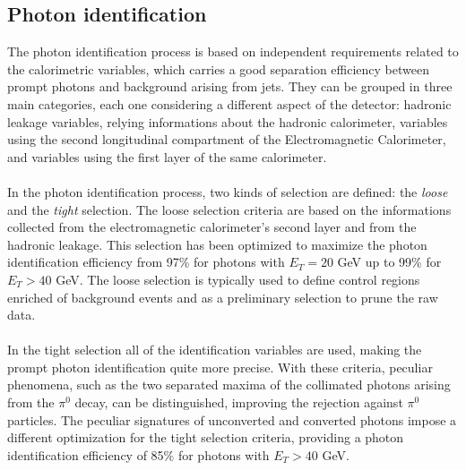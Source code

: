 \subsection{Photon identification}
The photon identification process is based on independent requirements related to the calorimetric variables, which carries a good separation efficiency between prompt photons and background arising from jets. They can be grouped in three main categories, each one considering a different aspect of the detector: hadronic leakage variables, relying informations about the hadronic calorimeter, variables using the second longitudinal compartment of the Electromagnetic Calorimeter, and variables using the first layer of the same calorimeter.
\\\\
In the photon identification process, two kinds of selection are defined: the \emph{loose} and the \emph{tight} selection. The loose selection criteria are based on the informations collected from the electromagnetic calorimeter's second layer and from the hadronic leakage. This selection has been optimized to maximize the photon identification efficiency from 97\% for photons with $E_T = 20$ GeV up to 99\% for $E_T > 40$ GeV. The loose selection is typically used to define control regions enriched of background events and as a preliminary selection to prune the raw data. 
\\\\
In the tight selection all of the identification variables are used, making the prompt photon identification quite more precise. With these criteria, peculiar phenomena, such as the two separated maxima of the collimated photons arising from the $\pi^0$ decay, can be distinguished, improving the rejection against $\pi^0$ particles. The peculiar signatures of unconverted and converted photons impose a different optimization for the tight selection criteria, providing a photon identification efficiency of 85\% for photons with $E_T > 40$ GeV.
